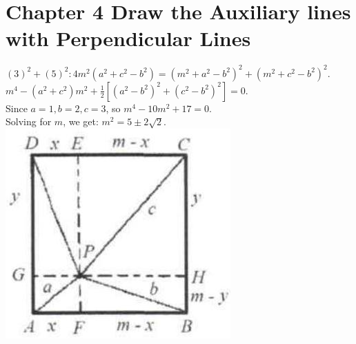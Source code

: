 \documentclass[10pt]{article}
\begin{document}
\section*{Chapter 4 Draw the Auxiliary lines with Perpendicular Lines}
\((3)^{2}+(5)^{2}: 4 m^{2}\left(a^{2}+c^{2}-b^{2}\right)=\left(m^{2}+a^{2}-b^{2}\right)^{2}+\left(m^{2}+c^{2}-b^{2}\right)^{2}\). \(m^{4}-\left(a^{2}+c^{2}\right) m^{2}+\frac{1}{2}\left[\left(a^{2}-b^{2}\right)^{2}+\left(c^{2}-b^{2}\right)^{2}\right]=0\).\\
Since \(a=1, b=2, c=3\), so \(m^{4}-10 m^{2}+17=0\).\\
Solving for \(m\), we get: \(m^{2}=5 \pm 2 \sqrt{2}\).\\
\includegraphics[max width=\textwidth, center]{2025_04_17_97bc1f7e44d93c271a88g-096}
\end{document}
